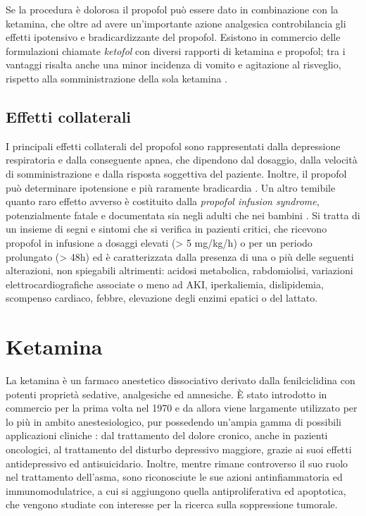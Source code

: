 Se la procedura è dolorosa il propofol può essere dato in combinazione con la ketamina, che oltre ad avere un'importante azione analgesica controbilancia gli effetti ipotensivo e bradicardizzante del propofol. Esistono in commercio delle formulazioni chiamate \emph{ketofol} con diversi rapporti di ketamina e propofol; tra i vantaggi risalta anche una minor incidenza di vomito e agitazione al risveglio, rispetto alla somministrazione della sola ketamina \cite{Simeupsedazione}. %

\subsection*{Effetti collaterali}

I principali effetti collaterali del propofol sono rappresentati dalla depressione respiratoria e dalla conseguente apnea, che dipendono dal dosaggio, dalla velocità di somministrazione e dalla risposta soggettiva del paziente. Inoltre, il propofol può determinare ipotensione e più raramente bradicardia \cite{propofolsafety2010}.
Un altro temibile quanto raro effetto avverso è costituito dalla \emph{propofol infusion syndrome}, potenzialmente fatale e documentata sia negli adulti che nei bambini \cite{Propofolinfusionsyndrome2019}. Si tratta di un insieme di segni e sintomi che si verifica in pazienti critici, che ricevono propofol in infusione a dosaggi elevati (> 5 mg/kg/h) o per un periodo prolungato (> 48h) ed è caratterizzata dalla presenza di una o più delle seguenti alterazioni, non spiegabili altrimenti: acidosi metabolica, rabdomiolisi, variazioni elettrocardiografiche associate o meno ad AKI, iperkaliemia, dislipidemia, scompenso cardiaco, febbre, elevazione degli enzimi epatici o del lattato. 

\section{Ketamina}

La ketamina è un farmaco anestetico dissociativo derivato dalla fenilciclidina con potenti proprietà sedative, analgesiche ed amnesiche. \`E stato introdotto in commercio per la prima volta nel 1970 e da allora viene largamente utilizzato per lo più in ambito anestesiologico, pur possedendo un'ampia gamma di possibili applicazioni cliniche \cite{Ketamineapplication2019}: dal trattamento del dolore cronico, anche in pazienti oncologici, al trattamento del disturbo depressivo maggiore, grazie ai suoi effetti antidepressivo ed antisuicidario. Inoltre, mentre rimane controverso il suo ruolo nel trattamento dell'asma, sono riconosciute le sue azioni antinfiammatoria ed immunomodulatrice, a cui si aggiungono quella antiproliferativa ed apoptotica, che vengono studiate con interesse per la ricerca sulla soppressione tumorale.

